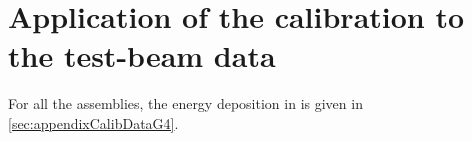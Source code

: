 \section{Application of the calibration to the test-beam data}

For all the assemblies, the energy deposition in \ev is given in \cref{sec:appendixCalibDataG4}.

